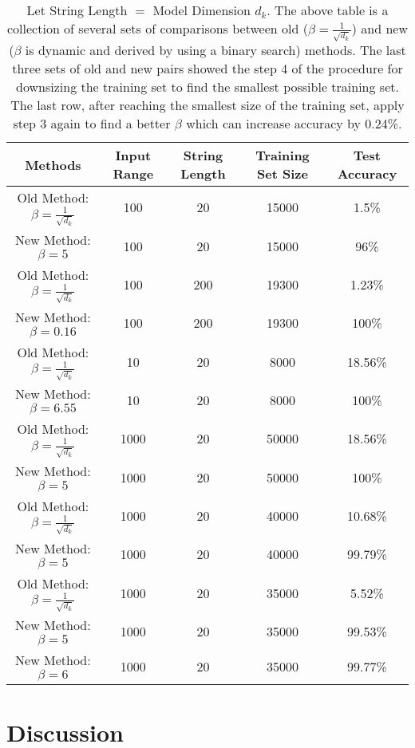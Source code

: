 \documentclass{article}
\theoremstyle{plain}
\theoremstyle{plain} %
\theoremstyle{definition}  %
\theoremstyle{remark}  %
\theoremstyle{plain}
\begin{document}
\begin{table}[!h]
\begin{center}
\begin{tabular}{||c c c c c||} 
 \hline
 Methods & Input Range & String Length & Training Set Size & Test Accuracy \\ [0.5ex] 
 \hline\hline
 Old Method: $\beta=\frac{1}{\sqrt{d_k}}$  & 100 & 20 & 15000 & 1.5\% \\ 
 New Method: $\beta=5$  & 100 & 20 & 15000 & 96\% \\
 \hline
 Old Method: $\beta=\frac{1}{\sqrt{d_k}}$  & 100 & 200 & 19300 & 1.23\%\\
 New Method: $\beta=0.16$  & 100 & 200 & 19300 &  100\%\\
 \hline
 Old Method: $\beta=\frac{1}{\sqrt{d_k}}$  & 10 & 20 & 8000 &  18.56\%\\ 
 New Method: $\beta=6.55$  & 10 & 20 & 8000 &  100\%\\
 \hline
 Old Method: $\beta=\frac{1}{\sqrt{d_k}}$  & 1000 & 20 & 50000 &  18.56\%\\ 
 New Method: $\beta=5$  & 1000 & 20 & 50000 &  100\%\\
 \hline
 Old Method: $\beta=\frac{1}{\sqrt{d_k}}$  & 1000 & 20 & 40000 &  10.68\%\\ 
 New Method: $\beta=5$  & 1000 & 20 & 40000 &  99.79\%\\
 \hline
 Old Method: $\beta=\frac{1}{\sqrt{d_k}}$  & 1000 & 20 & 35000 &  5.52\%\\ 
 New Method: $\beta=5$  & 1000 & 20 & 35000 &  99.53\%\\
 New Method: $\beta=6$  & 1000 & 20 & 35000 &  99.77\%\\ [1ex] 
 \hline
 

 \hline
\end{tabular}
\caption{Let String Length $=$ Model Dimension $d_k$.  The above table is a collection of several sets of comparisons between old ($\beta=\frac{1}{\sqrt{d_k}}$) and new ($\beta$ is dynamic and derived by using a binary search) methods. The last three sets of old and new pairs showed the step 4 of the procedure for downsizing the training set to find the smallest possible training set. The last row, after reaching the smallest size of the training set, apply step 3 again to find a better $\beta$ which can increase accuracy by 0.24\%.}
\end{center}
\end{table}
\section{Discussion}
\end{document}
